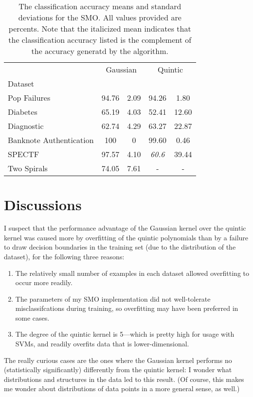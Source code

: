 \documentclass{journal}
\begin{document}
\begin{table}[h]
\centering{}
\caption{The classification accuracy means and standard deviations
for the SMO. All values provided are percents. Note that the italicized mean
indicates that the classification accuracy listed is the complement of the
accuracy generatd by the algorithm.}\label{tab:results}
\begin{tabular}{lcccc}
    & \multicolumn{2}{c}{Gaussian} & \multicolumn{2}{c}{Quintic}
    \\ \cline{2-3} \cline{3-5}
    Dataset & \mu{} & \sigma{} & \mu{} & \sigma{} \\ \toprule
    Pop Failures & 94.76 & 2.09 & 94.26 & 1.80 \\
    Diabetes & 65.19 & 4.03 & 52.41 & 12.60 \\
    Diagnostic & 62.74 & 4.29 & 63.27 & 22.87 \\
    Banknote Authentication & 100 & 0 & 99.60 & 0.46 \\
    SPECTF & 97.57 & 4.10 & \emph{60.6} & 39.44 \\
    Two Spirals & 74.05 & 7.61 & - & -
\end{tabular}
\end{table}

\section{Discussions}
I suspect that the performance advantage of the Gaussian kernel over the quintic
kernel was caused more by overfitting of the quintic polynomials than by a
failure to draw decision boundaries in the training set (due to the
distribution of the dataset), for the following three reasons:

\begin{enumerate}
    \item The relatively small number of examples in each dataset allowed
          overfitting to occur more readily.
    \item The parameters of my SMO implementation did not well-tolerate
          misclassifcations during training, so overfitting may have been
          preferred in some cases.
    \item The degree of the quintic kernel is 5---which is pretty high for
          usage with SVMs, and readily overfits data that is lower-dimensional.
\end{enumerate}

The really curious cases are the ones where the Gaussian kernel performs
no (statistically significantly) differently from the quintic kernel: I wonder
what distributions and structures in the data led to this result. (Of course,
this makes me wonder about distributions of data points in a more general
sense, as well.)
\end{document}
